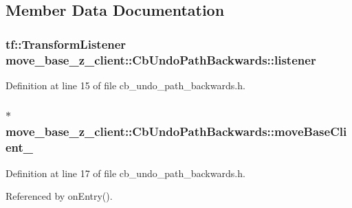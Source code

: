 \subsection{Member Data Documentation}
\subsubsection[{\texorpdfstring{listener}{listener}}]{\setlength{\rightskip}{0pt plus 5cm}tf\+::\+Transform\+Listener move\+\_\+base\+\_\+z\+\_\+client\+::\+Cb\+Undo\+Path\+Backwards\+::listener\hspace{0.3cm}{\ttfamily [private]}}\hypertarget{classmove__base__z__client_1_1CbUndoPathBackwards_a197e2034e873c09de896e7a8b6fe898f}{}\label{classmove__base__z__client_1_1CbUndoPathBackwards_a197e2034e873c09de896e7a8b6fe898f}


Definition at line 15 of file cb\+\_\+undo\+\_\+path\+\_\+backwards.\+h.

\subsubsection[{\texorpdfstring{move\+Base\+Client\+\_\+}{moveBaseClient_}}]{$\ast$ move\+\_\+base\+\_\+z\+\_\+client\+::\+Cb\+Undo\+Path\+Backwards\+::move\+Base\+Client\+\_\+\hspace{0.3cm}{\ttfamily [private]}}\hypertarget{classmove__base__z__client_1_1CbUndoPathBackwards_a19e7ace85698725a1d2730a7c6b3aa7d}{}\label{classmove__base__z__client_1_1CbUndoPathBackwards_a19e7ace85698725a1d2730a7c6b3aa7d}


Definition at line 17 of file cb\+\_\+undo\+\_\+path\+\_\+backwards.\+h.



Referenced by on\+Entry().



